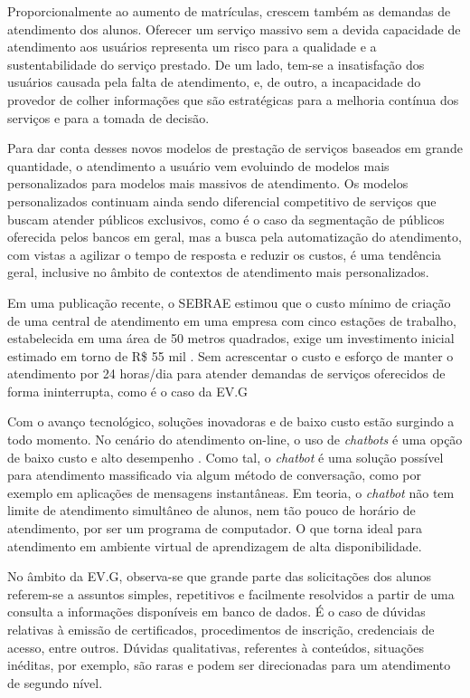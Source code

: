 Proporcionalmente ao aumento de matrículas, crescem também as demandas de atendimento dos alunos. Oferecer um serviço massivo sem a devida capacidade de atendimento aos usuários representa um risco para a qualidade e a sustentabilidade do serviço prestado. De um lado, tem-se a insatisfação dos usuários causada pela falta de atendimento, e, de outro, a incapacidade do provedor de colher informações que são estratégicas para a melhoria contínua dos serviços e para a tomada de decisão.

Para dar conta desses novos modelos de prestação de serviços baseados em grande quantidade, o atendimento a usuário vem evoluindo de modelos mais personalizados para modelos mais massivos de atendimento. Os modelos personalizados continuam ainda sendo diferencial competitivo de serviços que buscam atender públicos exclusivos, como é o caso da segmentação de públicos oferecida pelos bancos em geral, mas a busca pela automatização do atendimento, com vistas a agilizar o tempo de resposta e reduzir os custos, é uma tendência geral, inclusive no âmbito de contextos de atendimento mais personalizados. 

Em uma publicação recente, o SEBRAE estimou que o custo mínimo de criação de uma central de atendimento em uma empresa com cinco estações de trabalho, estabelecida em uma área de 50 metros quadrados, exige um investimento inicial estimado em torno de R\$ 55 mil \cite{SebraeCallCenter}.
Sem acrescentar o custo e esforço de manter o atendimento por 24 horas/dia para atender demandas de serviços oferecidos de forma ininterrupta, como é o caso da EV.G

Com o avanço tecnológico, soluções inovadoras e de baixo custo estão surgindo a todo momento.
No cenário do atendimento on-line, o uso de \textit{chatbots} é uma opção de baixo custo e alto desempenho \cite{CallCenterInf}.
Como tal, o \textit{chatbot} é uma solução possível para atendimento massificado via algum método de conversação, como por exemplo em aplicações de mensagens instantâneas.
Em teoria, o \textit{chatbot} não tem limite de atendimento simultâneo de alunos, nem tão pouco de horário de atendimento, por ser um programa de computador.
O que torna ideal para atendimento em ambiente virtual de aprendizagem de alta disponibilidade.

No âmbito da EV.G, observa-se que grande parte das solicitações dos alunos referem-se a assuntos simples, repetitivos e facilmente resolvidos a partir de uma consulta a informações disponíveis em banco de dados. É o caso de dúvidas relativas à emissão de certificados, procedimentos de inscrição, credenciais de acesso, entre outros. Dúvidas qualitativas, referentes à conteúdos, situações inéditas, por exemplo, são raras e podem ser direcionadas para um atendimento de segundo nível.   

